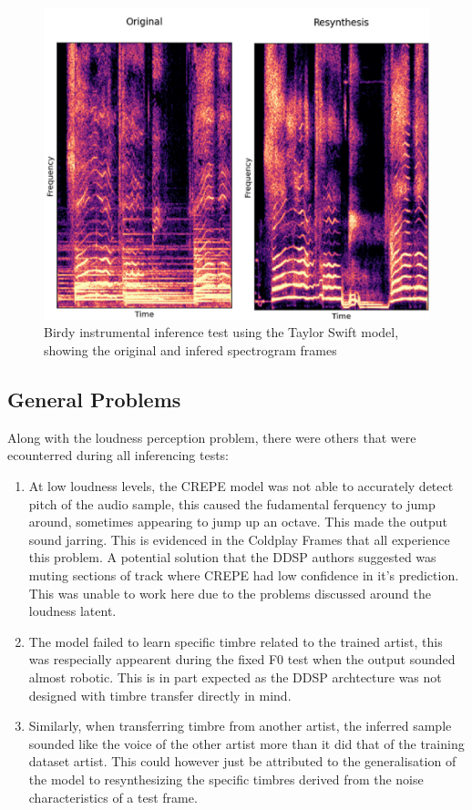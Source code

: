 \begin{figure}[H]
    \centering
    \includegraphics[width=\textwidth]{research/results/Birdy/InferenceWithInstrumentals.png}
    \caption{Birdy instrumental inference test using the Taylor Swift model, showing the original and infered spectrogram frames}
\end{figure}

\subsection{General Problems}

Along with the loudness perception problem, there were others that were ecounterred during all inferencing tests:

\begin{enumerate}
    \item At low loudness levels, the CREPE model was not able to accurately detect pitch of the audio sample, this caused the fudamental ferquency to jump around, sometimes appearing to jump up an octave. This made the output sound jarring. This is evidenced in the Coldplay Frames that all experience this problem. A potential solution that the DDSP authors suggested was muting sections of track where CREPE had low confidence in it's prediction. This was unable to work here due to the problems discussed around the loudness latent.
    \item The model failed to learn specific timbre related to the trained artist, this was respecially appearent during the fixed F0 test when the output sounded almost robotic. This is in part expected as the DDSP archtecture was not designed with timbre transfer directly in mind.
    \item Similarly, when transferring timbre from another artist, the inferred sample sounded like the voice of the other artist more than it did that of the training dataset artist. This could however just be attributed to the generalisation of the model to resynthesizing the specific timbres derived from the noise characteristics of a test frame.
\end{enumerate}
